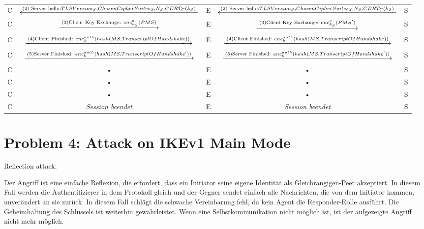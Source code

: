\documentclass[12pt,pdftex,a4paper]{article}
\begin{document}
\begin{sidewaystable}[ph!]
\begin{tabular}{|c|c|c|c|c|}
		C &  $\xlongleftarrow{\text{(2) Server hello:} TLSVersion_{S},  ChosenCipherSuites_{S}, N_{S}, CERT_{C}(k_{S})}$ & E &  $\xlongleftarrow{\text{(2) Server hello:} TLSVersion_{S},  ChosenCipherSuites_{S}, N_{S}, CERT_{C}(k_{S})}$ & S \\ 
		
		C &  $\xlongrightarrow{\text{(3)Client Key Exchange: } enc^{a}_{k_{S}}(PMS)}$  & E &  $\xlongrightarrow{\text{(3)Client Key Exchange: } enc^{a}_{k_{S}}(PMS')}$  & S \\ 
		
		C &  $\xlongrightarrow{\text{(4)Client Finished: } enc_{k}^{auth}(hash(MS, TranscriptOfHandshake))}$  & E &  $\xlongrightarrow{\text{(4)Client Finished: } enc_{k}^{auth}(hash(MS, TranscriptOfHandshake))}$  & S \\ 
		
		C &  $\xlongrightarrow{\text{(5)Server Finished: } enc_{k}^{auth}(hash(MS, TranscriptOfHandshake'))}$ & E &  $\xlongrightarrow{\text{(5)Server Finished: } enc_{k}^{auth}(hash(MS, TranscriptOfHandshake'))}$ & S \\ 
		C & • & E & • & S \\ 
		C & • & E & • & S \\ 
		C & • & E & • & S \\ 
		C & \textit{Session beendet} & E & \textit{Session beendet} & S \\ 
	\end{tabular} 
\end{sidewaystable}
\clearpage

\section*{Problem 4: Attack on IKEv1 Main Mode}
Reflection attack:

Der Angriff ist eine einfache Reflexion, die erfordert, dass ein Initiator seine eigene Identität als Gleichrangigen-Peer akzeptiert. In diesem Fall werden die Authentifizierer in dem Protokoll gleich und der Gegner sendet einfach alle Nachrichten, die von dem Initiator kommen, unverändert an sie zurück. In diesem Fall schlägt die schwache Vereinbarung fehl, da kein Agent die Responder-Rolle ausführt. Die Geheimhaltung des Schlüssels ist weiterhin gewährleistet. Wenn eine Selbstkommunikation nicht möglich ist, ist der aufgezeigte Angriff nicht mehr möglich.
\end{document}
